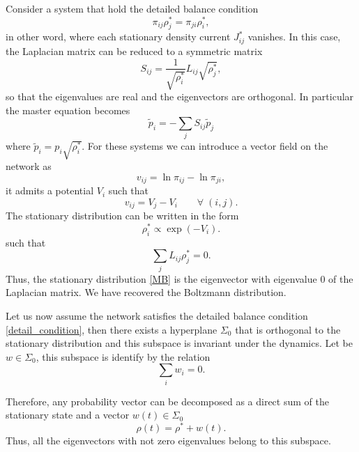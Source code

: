 Consider a system that hold the detailed balance condition
\begin{equation}\label{detail_condition}
    \pi_{ij} \rho_j^* = \pi_{ji} \rho_i^*,
\end{equation}
in other word, where each stationary density current $J^*_{ij}$ vanishes.
In this case, the Laplacian matrix can be reduced to a symmetric matrix 
\begin{equation}
    S_{ij}=\frac{1}{\sqrt{\rho_i^\ast}}L_{ij}\sqrt{\rho_j^\ast},
\end{equation}
so that the eigenvalues are real and the eigenvectors are orthogonal. In particular the master equation becomes  
\begin{equation}
    \tilde p_i=-\sum_j S_{ij} \tilde p_j
\end{equation}
where $\tilde p_i=p_i\sqrt{\rho_i^\ast}$.
For these systems we can introduce a vector field on the network as
\begin{equation}
    v_{ij}=\ln \pi_{ij}-\ln \pi_{ji}, 
\end{equation}
it admits a potential $V_i$ such that
\begin{equation}
    v_{ij}=V_j-V_i\qquad \forall \; (i,j) .
\end{equation}
The stationary distribution can be written in the form
\begin{equation}\label{MB}
    \rho_i^\ast \propto \exp(-V_i).
\end{equation} 
such that
\begin{equation}
    \sum_j L_{ij}\rho^*_j =  0.
\end{equation}
Thus, the stationary distribution \eqref{MB} is the eigenvector with eigenvalue $0$ of the Laplacian matrix.
We have recovered the Boltzmann distribution.


Let us now assume the network satisfies the detailed balance condition \eqref{detail_condition}, then there exists a hyperplane $\Sigma_0$ that is orthogonal to the stationary distribution and this subspace is invariant under the dynamics. Let be $w \in \Sigma_0$, this subspace is identify by the relation
\begin{equation}
    \sum_i w_i = 0.
\end{equation}


Therefore, any probability vector can be decomposed as a direct sum of the stationary state and a vector $w(t) \in \Sigma_0$ 
\begin{equation}
    \rho(t) = \rho^* + w(t).
\end{equation}
Thus, all the eigenvectors with not zero eigenvalues belong to this subspace.



